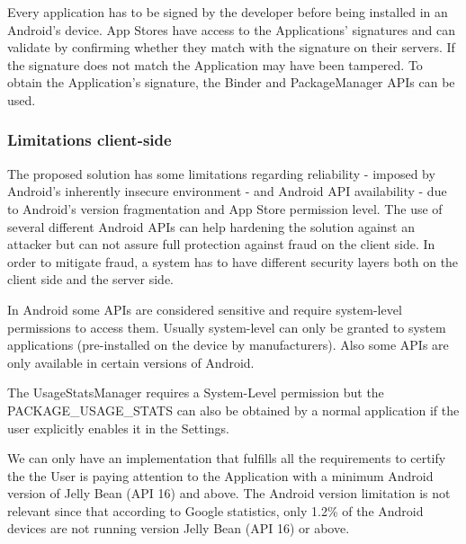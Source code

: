 Every application has to be signed by the developer before being installed in an Android's device. App Stores have access to the Applications' signatures and can validate by confirming whether they match with the signature on their servers. If the signature does not match the Application may have been tampered. To obtain the Application's signature, the Binder and PackageManager APIs can be used.

\subsubsection{Limitations client-side}

The proposed solution has some limitations regarding reliability - imposed by Android's inherently insecure environment - and Android API availability - due to Android's version fragmentation and App Store permission level. The use of several different Android APIs can help hardening the solution against an attacker but can not assure full protection against fraud on the client side. In order to mitigate fraud, a system has to have different security layers both on the client side and the server side. 

In Android some APIs are considered sensitive and require system-level permissions to access them. Usually system-level can only be granted to system applications (pre-installed on the device by manufacturers). Also some APIs are only available in certain versions of Android. %



The UsageStatsManager requires a System-Level permission but the PACKAGE\_USAGE\_STATS can also be obtained by a normal application if the user explicitly enables it in the Settings.

We can only have an implementation that fulfills all the requirements to certify the the User is paying attention to the Application with a minimum Android version of Jelly Bean (API 16) and above. The Android version limitation is not relevant since that according to Google statistics, only 1.2\% of the Android devices are not running version Jelly Bean (API 16) or above. %

